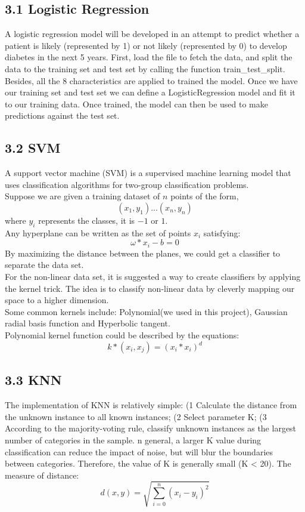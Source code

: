 \documentclass[11pt]{article}
\begin{document}
\subsection{3.1 Logistic Regression}
A logistic regression model will be developed in an attempt to predict whether a patient is likely (represented by 1) or not likely (represented by 0) to develop diabetes in the next 5 years.
First, load the file to fetch the data, and split the data to the training set and test set by calling the function train\_test\_split. Besides, all the 8 characteristics are applied to trained the model. 
Once we have our training set and test set we can define a LogisticRegression model and fit it to our training data. Once trained, the model can then be used to make predictions against the test set.

\subsection{3.2 SVM}
A support vector machine (SVM) is a supervised machine learning model that uses classification algorithms for two-group classification problems.
\\
Suppose we are given a training dataset of $n$ points of the form,
\[
(x_1,y_1)...(x_n,y_n)
\]
where $y_i$ represents the classes, it is $-1$ or $1$.
\\
Any hyperplane can be written as the set of points $x_i$ satisfying:
\[
\omega*x_i-b=0
\]
By maximizing the distance between the planes, we could get a classifier to separate the data set.
\\
For the non-linear data set, it is suggested a way to create classifiers by applying the kernel trick. The idea is to classify non-linear data by cleverly mapping our space to a higher dimension. 
\\
Some common kernels include: Polynomial(we used in this project), Gaussian radial basis function and Hyperbolic tangent.
\\
Polynomial kernel function could be described by the equations:
\[
k*(x_i,x_j) = (x_i*x_i)^d
\]

\subsection{3.3 KNN}
The implementation of KNN is relatively simple: (1 Calculate the distance from the unknown instance to all known instances; (2 Select parameter K; (3 According to the majority-voting rule, classify unknown instances as the largest number of categories in the sample. n general, a larger K value during classification can reduce the impact of noise, but will blur the boundaries between categories. 
Therefore, the value of K is generally small (K < 20). The  measure of distance:
\[
d(x, y) = \sqrt{\sum^n_{i=0}(x_i-y_i)^2}
\]
\end{document}
